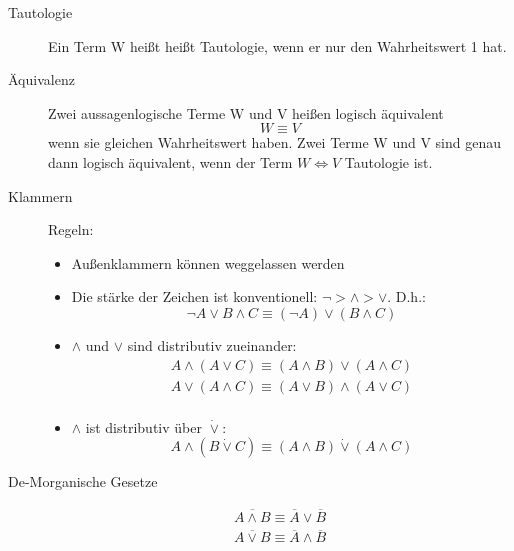 \begin{description}
    \item[Tautologie] Ein Term W heißt heißt Tautologie, wenn er nur den Wahrheitswert 1 hat.
    \item[Äquivalenz] Zwei aussagenlogische Terme W und V heißen logisch äquivalent \[W \equiv V\] wenn sie gleichen Wahrheitswert haben.
    Zwei Terme W und V sind genau dann logisch äquivalent, wenn der Term $W\Leftrightarrow V$ Tautologie ist.
    \item[Klammern] Regeln:
    \begin{itemize}
        \item Außenklammern können weggelassen werden
        \item Die stärke der Zeichen ist konventionell: $\neg > \wedge > \vee$.
        D.h.:
        \[\neg A \vee B \wedge C \equiv (\neg A) \vee (B \wedge C)\]
        \item $\wedge$ und $\vee$ sind distributiv zueinander:
        \begin{gather*}
            A \wedge (A \vee C) \equiv (A \wedge B) \vee (A \wedge C)\\
            A \vee (A \wedge C) \equiv (A \vee B) \wedge (A \vee C)\\
        \end{gather*}
        \item $\wedge$ ist distributiv über $\dot{\vee}$:
        \[A \wedge (B \dot{\vee} C) \equiv (A \wedge B) \dot{\vee} (A \wedge C)\]
    \end{itemize}
    \item[De-Morganische Gesetze] \begin{gather*}
                                      \overline{A \wedge B} \equiv \overline{A} \vee \overline{B}\\
                                      \overline{A \vee B} \equiv \overline{A} \wedge \overline{B}\\
    \end{gather*}
\end{description}

